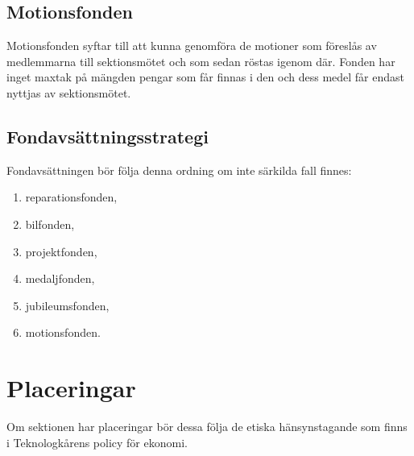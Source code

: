 \documentclass{dsekprotokoll}
\begin{document}
\subsection{Motionsfonden}
Motionsfonden syftar till att kunna genomföra de motioner som föreslås av
medlemmarna till sektionsmötet och som sedan röstas igenom där. Fonden har inget
maxtak på mängden pengar som får finnas i den och dess medel får endast nyttjas
av sektionsmötet.

\subsection{Fondavsättningsstrategi}
Fondavsättningen bör följa denna ordning om inte särkilda fall finnes:
\begin{enumerate}
  \item reparationsfonden,
  \item bilfonden,
  \item projektfonden,
  \item medaljfonden,
  \item jubileumsfonden,
  \item motionsfonden.
\end{enumerate}

\section{Placeringar}
Om sektionen har placeringar bör dessa följa de etiska hänsynstagande som finns
i Teknologkårens policy för ekonomi.
\end{document}

